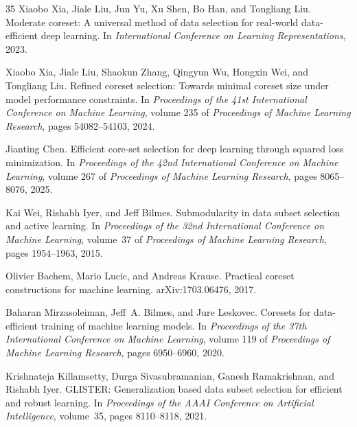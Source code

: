 \documentclass[12pt]{article}
\begin{document}
\begin{thebibliography}{35}
Xiaobo Xia, Jiale Liu, Jun Yu, Xu Shen, Bo Han, and Tongliang Liu.
\newblock Moderate coreset: A universal method of data selection for real-world
  data-efficient deep learning.
\newblock In \emph{International Conference on Learning Representations},
  2023.

Xiaobo Xia, Jiale Liu, Shaokun Zhang, Qingyun Wu, Hongxin Wei, and Tongliang
  Liu.
\newblock Refined coreset selection: Towards minimal coreset size under model
  performance constraints.
\newblock In \emph{Proceedings of the 41st International Conference on Machine
  Learning}, volume 235 of \emph{Proceedings of Machine Learning Research},
  pages 54082--54103, 2024.

Jianting Chen.
\newblock Efficient core-set selection for deep learning through squared loss
  minimization.
\newblock In \emph{Proceedings of the 42nd International Conference on Machine
  Learning}, volume 267 of \emph{Proceedings of Machine Learning Research},
  pages 8065--8076, 2025.

Kai Wei, Rishabh Iyer, and Jeff Bilmes.
\newblock Submodularity in data subset selection and active learning.
\newblock In \emph{Proceedings of the 32nd International Conference on Machine
  Learning}, volume~37 of \emph{Proceedings of Machine Learning Research}, pages
  1954--1963, 2015.

Olivier Bachem, Mario Lucic, and Andreas Krause.
\newblock Practical coreset constructions for machine learning.
\newblock arXiv:1703.06476, 2017.

Baharan Mirzasoleiman, Jeff~A. Bilmes, and Jure Leskovec.
\newblock Coresets for data-efficient training of machine learning models.
\newblock In \emph{Proceedings of the 37th International Conference on Machine
  Learning}, volume 119 of \emph{Proceedings of Machine Learning Research},
  pages 6950--6960, 2020.

Krishnateja Killamsetty, Durga Sivasubramanian, Ganesh Ramakrishnan, and
  Rishabh Iyer.
\newblock GLISTER: Generalization based data subset selection for efficient and
  robust learning.
\newblock In \emph{Proceedings of the AAAI Conference on Artificial
  Intelligence}, volume~35, pages 8110--8118, 2021{}.


\end{thebibliography}
\end{document}
